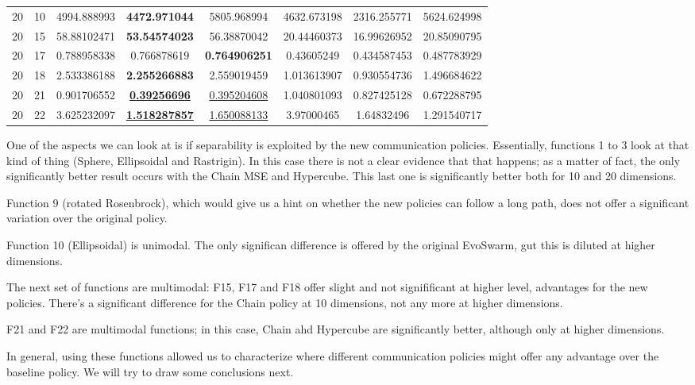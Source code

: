 \documentclass[runningheads]{llncs}
\begin{document}
\begin{table}[h!tb]
{\begin{tabular}{|c|c||c|c|c||c|c|c|}
20	&	10	&	4994.888993	&	\textbf{4472.971044}	&	5805.968994	&	4632.673198	&	2316.255771	&	5624.624998	\\
20	&	15	&	58.88102471	&	\textbf{53.54574023}	&	56.38870042	&	20.44460373	&	16.99626952	&	20.85090795	\\
20	&	17	&	0.788958338	&	0.766878619	&	\textbf{0.764906251}	&	0.43605249	&	0.434587453	&	0.487783929	\\
20	&	18	&	2.533386188	&	\textbf{2.255266883}	&	2.559019459	&	1.013613907	&	0.930554736	&	1.496684622	\\
20	&	21	&	0.901706552	&	\underline{\textbf{0.39256696}}	&	\underline{0.395204608}	&	1.040801093	&	0.827425128	&	0.672288795	\\
20	&	22	&	3.625232097	&	\underline{\textbf{1.518287857}}	&	\underline{1.650088133}	&	3.97000465	&	1.64832496	&	1.291540717	\\

    \hline
    \end{tabular}}
    \label{tab:my_label}
\end{table}
\hfill\break


One of the aspects we can look at is if separability is exploited by
the new communication policies. Essentially, functions 1 to 3
look at that kind of thing (Sphere, Ellipsoidal and Rastrigin). In
this case there is not a clear evidence that that happens; as a matter
of fact, the only significantly better result occurs with the Chain
MSE and Hypercube. This last one is significantly better both for 10
and 20 dimensions.

Function 9 (rotated Rosenbrock), which would give us a hint on whether
the new policies can follow a long path, does not offer a significant
variation over the original policy.

Function 10 (Ellipsoidal) is unimodal. The only significan difference
is offered by the original EvoSwarm, gut this is diluted at higher
dimensions.

The next set of functions are multimodal: F15, F17 and F18 offer
slight and not signifificant at higher level, advantages for the new
policies. There's a significant difference for the Chain policy at 10
dimensions, not any more at higher dimensions.

F21 and F22 are multimodal functions; in this case, Chain ahd
Hypercube are significantly better, although only at higher
dimensions.

In general, using these functions allowed us to characterize where
different communication policies might offer any advantage over the
baseline policy. We will try to draw some conclusions next.
\end{document}

